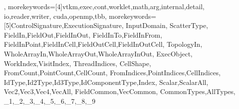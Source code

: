 {{                   },
  morekeywords={[4]vtkm,exec,cont,worklet,math,arg,internal,detail,
                   io,reader,writer,
                   cuda,openmp,tbb},
  morekeywords={[5]ControlSignature,ExecutionSignature,
                   InputDomain,
                   ScatterType,
                   FieldIn,FieldOut,FieldInOut,
                   FieldInTo,FieldInFrom,
                   FieldInPoint,FieldInCell,FieldOutCell,FieldInOutCell,
                   TopologyIn,
                   WholeArrayIn,WholeArrayOut,WholeArrayInOut,
                   ExecObject,
                   WorkIndex,VisitIndex,
                   ThreadIndices,
                   CellShape,
                   FromCount,PointCount,CellCount,
                   FromIndices,PointIndices,CellIndices,
                   IdType,Id2Type,Id3Type,IdComponentType,Index,
                   Scalar,ScalarAll,
                   Vec2,Vec3,Vec4,VecAll,
                   FieldCommon,VecCommon,
                   CommonTypes,AllTypes,
                   _1,_2,_3,_4,_5,_6,_7,_8,_9
                   }
}
\lstset{language=VTKm}

\renewcommand{\lstlistlistingname}{List of Examples}
\renewcommand{\lstlistingname}{Example}

\newcommand*{\textcode}[1]{\textnormal{\texttt{#1}}}
\newcommand*{\textnamespace}[1]{\textcode{\color{vtkmnamespace}{#1}}}
\newcommand*{\textmacro}[1]{\textcode{\color{vtkmmacro}{#1}}}
\newcommand*{\textidentifier}[1]{\textcode{\color{vtkmidentifier}{#1}}}
\newcommand*{\textsignature}[1]{\textcode{\color{vtkmsignature}{#1}}}

\newcommand*{\vtkmmacro}[1]{\textmacro{#1}\index{#1}}

\newcommand{\vtkmcontexport}{\vtkmmacro{VTKM\_CONT\_EXPORT}\index{export!control}\index{function~export}\index{method~export}\xspace}
\newcommand{\vtkmexecexport}{\vtkmmacro{VTKM\_EXEC\_EXPORT}\index{export!execution}\index{function~export}\index{method~export}\xspace}
\newcommand{\vtkmexeccontexport}{\vtkmmacro{VTKM\_EXEC\_CONT\_EXPORT}\index{export!control}\index{export!execution}\index{function~export}\index{method~export}\xspace}

\newcommand{\controlsignature}{\textsignature{ControlSignature}\index{control~signature}\index{signature!control}\xspace}
\newcommand{\executionsignature}{\textsignature{ExecutionSignature}\index{execution~signature}\index{signature!execution}\xspace}
\newcommand{\inputdomain}{\textsignature{InputDomain}\index{input~domain}\xspace}
\newcommand{\scattertype}{\textsignature{ScatterType}\index{scatter~type}\xspace}

